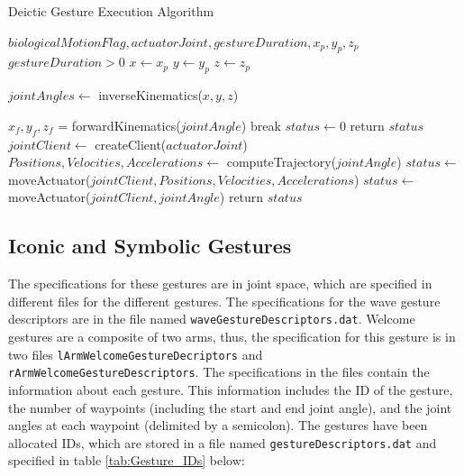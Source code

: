 \documentclass{CSSRforAfrica}
\begin{document}
\newpage
\begin{algorithm}
	\caption{Deictic Gesture Execution Algorithm}\label{alg:cap}
	\begin{algorithmic}
		\Require $biologicalMotionFlag,actuatorJoint, gestureDuration, x_p, y_p, z_p$
		\Ensure $gestureDuration > 0$
		\State $x \gets x_p$
		\State $y \gets y_p$
		\State $z \gets z_p$
		
		\State $jointAngles \gets $ inverseKinematics($x, y, z$) 
		
			\State $x_f, y_f, z_f$ = forwardKinematics($jointAngle$) 
			 
			    \State break
			\Else
			    \State $status \gets 0$
			    \State return $status$
			\EndIf
		\EndFor
		\State $jointClient \gets $ createClient($actuatorJoint$) 
			\State $Positions,Velocities, Accelerations \gets $ computeTrajectory($jointAngle$)
			\State $status \gets $ moveActuator($jointClient,Positions,Velocities, Accelerations$)
		\Else
			\State $status \gets $ moveActuator($jointClient,jointAngle$) 
		\EndIf
		\State return $status$
	\end{algorithmic}
\end{algorithm}

\newpage
\subsection{Iconic and Symbolic Gestures}

The specifications for these gestures are in joint space, which are specified in different files for the different gestures. The specifications for the wave gesture descriptors are in the file named \texttt{waveGestureDescriptors.dat}. Welcome gestures are a composite of two arms, thus, the specification for this gesture is in two files \texttt{lArmWelcomeGestureDecriptors} and \\ \texttt{rArmWelcomeGestureDescriptors}.  The specifications in the files contain the information about each gesture. This information includes the ID of the gesture, the number of waypoints (including the start and end joint angle), and the joint angles at each waypoint (delimited by a semicolon). The gestures have been allocated IDs, which are stored in a file named \texttt{gestureDescriptors.dat} and specified in table \ref{tab:Gesture_IDs} below:
\end{document}
